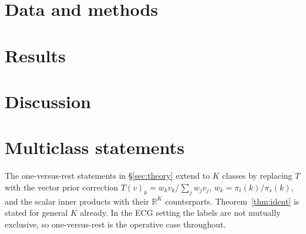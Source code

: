 \documentclass[11pt]{article}
\theoremstyle{plain}
\theoremstyle{definition}
\theoremstyle{remark}
\begin{document}


\section{Data and methods}
\label{sec:methods}


\section{Results}
\label{sec:results}


\section{Discussion}
\label{sec:discussion}





\appendix
\section{Multiclass statements}
\label{app:multiclass}
The one-versus-rest statements in \S\ref{sec:theory} extend to $K$ classes by
replacing $T$ with the vector prior correction
$T(v)_k = w_k v_k / \sum_j w_j v_j$, $w_k=\pi_t(k)/\pi_s(k)$, and the scalar
inner products with their $\mathbb{R}^K$ counterparts.  Theorem~\ref{thm:ident}
is stated for general $K$ already.  In the ECG setting the labels are not
mutually exclusive, so one-versus-rest is the operative case throughout.
\end{document}
